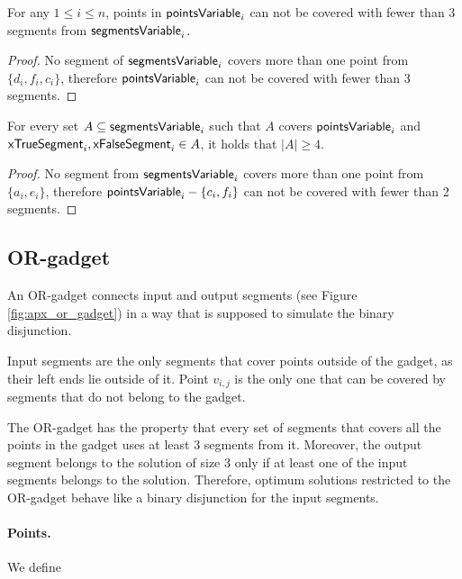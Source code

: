 \begin{lemma}
\label{choose_variables_no_less}
For any $1 \le i \le n$, points in $\mathsf{pointsVariable}_{i}$
can not be covered with fewer than 3 segments from $\mathsf{segmentsVariable}_{i}$.
\end{lemma}

\begin{proof}
No segment of $\mathsf{segmentsVariable}_{i}$ covers more than one point from
$\{d_i, f_i, c_i\}$, therefore $\mathsf{pointsVariable}_{i}$ can
not be covered with fewer than 3 segments.
\end{proof}

\begin{lemma}
\label{choose_variables_both}
For every set $A \subseteq \mathsf{segmentsVariable}_{i}$ such that $A$ covers $\mathsf{pointsVariable}_{i}$
and $\mathsf{xTrueSegment}_{i}, \mathsf{xFalseSegment}_{i} \in A$,
it holds that $|A| \ge 4$.
\end{lemma}
\begin{proof}
No segment from $\mathsf{segmentsVariable}_{i}$ covers more than one point from
$\{a_i, e_i\}$,
therefore 
$\mathsf{pointsVariable}_{i} - \{c_i, f_i\}$
can not be covered with fewer than 2 segments.
\end{proof}


\subsection{OR-gadget}

An OR-gadget connects input and output segments (see Figure \ref{fig:apx_or_gadget})
in a way that is supposed to simulate the binary disjunction.

Input segments are the only segments that cover points outside of the gadget,
as their left ends lie outside of it.
Point $v_{i,j}$ is the only one that can be covered
by segments that do not belong to the gadget.

The OR-gadget has the property that every set of segments
that covers all the points in the gadget uses at least 3 segments from it.
Moreover, the output segment belongs to the solution of size 3
only if at least one of the input segments belongs to the solution.
Therefore, optimum solutions restricted to the OR-gadget behave
like a binary disjunction for the input segments.


\paragraph{Points.}
We define

\newcommand{\chooseOr}[3]{\mathsf{chooseOr}^{#1}_{#2,#3}}
\newcommand{\orMoveVariable}[2]{\mathsf{orMoveVariable}_{#1,#2}}
\newcommand{\pointsOr}[2]{\mathsf{pointsOr}_{#1,#2}}
\newcommand{\segmentsOr}[2]{\mathsf{segmentsOr}_{#1,#2}}

